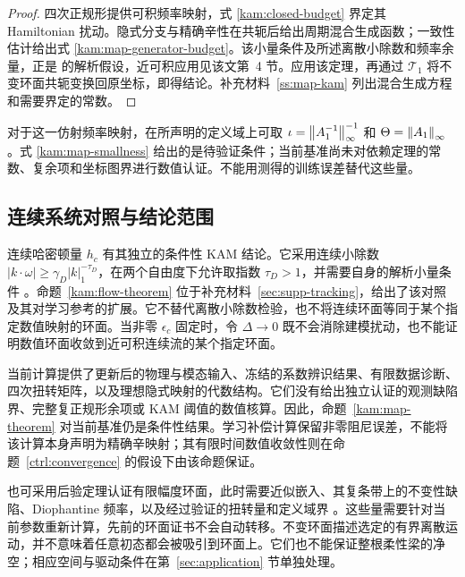 \begin{proof}
四次正规形提供可积频率映射，式 \eqref{kam:closed-budget} 界定其 Hamiltonian 扰动。隐式分支与精确辛性在共轭后给出周期混合生成函数；一致性估计给出式 \eqref{kam:map-generator-budget}。该小量条件及所述离散小除数和频率余量，正是 \citet[Theorem~2 and Remark~2]{shang} 的解析假设，近可积应用见该文第~4 节。应用该定理，再通过 $\mathcal T_1$ 将不变环面共轭变换回原坐标，即得结论。补充材料~\ref{ss:map-kam} 列出混合生成方程和需要界定的常数。
\end{proof}

对于这一仿射频率映射，在所声明的定义域上可取
$\iota=\left\lVert A_1^{-1}\right\rVert_\infty^{-1}$ 和
$\Theta=\left\lVert A_1\right\rVert_\infty$。式 \eqref{kam:map-smallness} 给出的是待验证条件；当前基准尚未对依赖定理的常数、复余项和坐标图界进行数值认证。不能用测得的训练误差替代这些量。

\subsection{连续系统对照与结论范围}
\label{kam:scope}

连续哈密顿量 $h_c$ 有其独立的条件性 KAM 结论。它采用连续小除数 $|k\cdot\omega|\ge\gamma_D|k|_1^{-\tau_D}$，在两个自由度下允许取指数 $\tau_D>1$，并需要自身的解析小量条件 \citep{poschel}。命题~\ref{kam:flow-theorem} 位于补充材料~\ref{sec:supp-tracking}，给出了该对照及其对学习参考的扩展。它不替代离散小除数检验，也不将连续环面等同于某个指定数值映射的环面。当非零 $\epsilon_c$ 固定时，令 $\Delta\to0$ 既不会消除建模扰动，也不能证明数值环面收敛到近可积连续流的某个指定环面。

当前计算提供了更新后的物理与模态输入、冻结的系数辨识结果、有限数据诊断、四次扭转矩阵，以及理想隐式映射的代数结构。它们没有给出独立认证的观测缺陷界、完整复正规形余项或 KAM 阈值的数值核算。因此，命题~\ref{kam:map-theorem} 对当前基准仍是条件性结果。学习补偿计算保留非零阻尼误差，不能将该计算本身声明为精确辛映射；其有限时间数值收敛性则在命题~\ref{ctrl:convergence} 的假设下由该命题保证。

也可采用后验定理认证有限幅度环面，此时需要近似嵌入、其复条带上的不变性缺陷、Diophantine 频率，以及经过验证的扭转量和定义域界 \citep{haro2019aposteriori}。这些量需要针对当前参数重新计算，先前的环面证书不会自动转移。不变环面描述选定的有界离散运动，并不意味着任意初态都会被吸引到环面上。它们也不能保证整根柔性梁的净空；相应空间与驱动条件在第~\ref{sec:application} 节单独处理。
